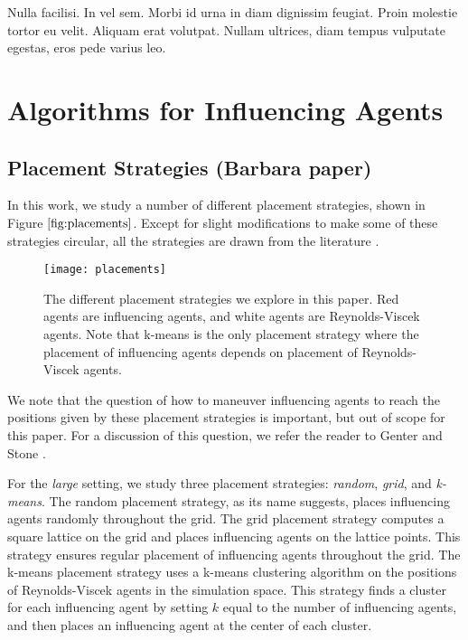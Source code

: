 \begin{savequote}[75mm]
Nulla facilisi. In vel sem. Morbi id urna in diam dignissim feugiat. Proin molestie tortor eu velit. Aliquam erat volutpat. Nullam ultrices, diam tempus vulputate egestas, eros pede varius leo.
\end{savequote}

\chapter{Algorithms for Influencing Agents}

\section{Placement Strategies (Barbara paper)}
In this work, we study a number of different placement strategies, shown in
Figure $\ref{fig:placements}$.
Except for slight modifications to make some of these strategies circular, all
the strategies are drawn from the literature \cite{genter2015placement,
genterthesis}.
\begin{figure}
    \centering
    \texttt{[image: placements]}
    \caption{The different placement strategies we explore in this paper.
    Red agents are influencing agents, and white agents are Reynolds-Viscek
    agents.
    Note that k-means is the only placement strategy where the placement of
    influencing agents depends on placement of Reynolds-Viscek agents.}
    \label{fig:placements}
\end{figure}
We note that the question of how to maneuver influencing agents to reach the
positions given by these placement strategies is important, but out of scope
for this paper.
For a discussion of this question, we refer the reader to Genter and Stone
\cite{genter2016facegoalfacecurrent, genterthesis}.

For the \textit{large} setting, we study three placement strategies:
\textit{random}, \textit{grid}, and \textit{k-means}.
The random placement strategy, as its name suggests, places influencing agents
randomly throughout the grid.
The grid placement strategy computes a square lattice on the grid and places
influencing agents on the lattice points.
This strategy ensures regular placement of influencing agents throughout the
grid.
The k-means placement strategy uses a k-means clustering algorithm on the
positions of Reynolds-Viscek agents in the simulation space.
This strategy finds a cluster for each influencing agent by setting $k$ equal
to the number of influencing agents, and then places an influencing agent at
the center of each cluster.


